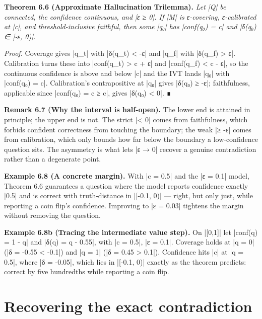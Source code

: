 \documentclass{memoir}
\begin{document}
\textbf{Theorem 6.6 (Approximate Hallucination Trilemma).} \emph{Let \LeanVerb|Q| be connected, the
confidence continuous, and \LeanVerb|ε ≥ 0|. If \LeanVerb|M| is ε-covering, ε-calibrated at \LeanVerb|c|,
and threshold-inclusive faithful, then some \LeanVerb|q₀| has \LeanVerb|conf(q₀) = c| and \LeanVerb|δ(q₀) ∈ [-ε, 0)|.}

\emph{Proof.} Coverage gives \LeanVerb|q_t| with \LeanVerb|δ(q_t) < -ε| and \LeanVerb|q_f| with \LeanVerb|δ(q_f) > ε|.
Calibration turns these into \LeanVerb|conf(q_t) > c + ε| and \LeanVerb|conf(q_f) < c - ε|, so the
continuous confidence is above and below \LeanVerb|c| and the IVT lands \LeanVerb|q₀| with
\LeanVerb|conf(q₀) = c|. Calibration's contrapositive at \LeanVerb|q₀| gives \LeanVerb|δ(q₀) ≥ -ε|;
faithfulness, applicable since \LeanVerb|conf(q₀) = c ≥ c|, gives \LeanVerb|δ(q₀) < 0|. ∎

\textbf{Remark 6.7 (Why the interval is half-open).} The lower end is attained in
principle; the upper end is not. The strict \LeanVerb|< 0| comes from faithfulness, which
forbids confident correctness from touching the boundary; the weak \LeanVerb|≥ -ε| comes
from calibration, which only bounds how far below the boundary a low-confidence
question sits. The asymmetry is what lets \LeanVerb|ε → 0| recover a genuine
contradiction rather than a degenerate point.

\textbf{Example 6.8 (A concrete margin).} With \LeanVerb|c = 0.5| and the \LeanVerb|ε = 0.1| model, Theorem
6.6 guarantees a question where the model reports confidence exactly \LeanVerb|0.5| and
is correct with truth-distance in \LeanVerb|[-0.1, 0)| — right, but only just, while
reporting a coin flip's confidence. Improving to \LeanVerb|ε = 0.03| tightens the margin
without removing the question.

\textbf{Example 6.8b (Tracing the intermediate value step).} On \LeanVerb|[0,1]| let
\LeanVerb|conf(q) = 1 - q| and \LeanVerb|δ(q) = q - 0.55|, with \LeanVerb|c = 0.5|, \LeanVerb|ε = 0.1|. Coverage
holds at \LeanVerb|q = 0| (\LeanVerb|δ = -0.55 < -0.1|) and \LeanVerb|q = 1| (\LeanVerb|δ = 0.45 > 0.1|). Confidence
hits \LeanVerb|c| at \LeanVerb|q = 0.5|, where \LeanVerb|δ = -0.05|, which lies in \LeanVerb|[-0.1, 0)| exactly as
the theorem predicts: correct by five hundredths while reporting a coin flip.



\section{Recovering the exact contradiction}\label{Two--Schemas--of--Impossibility-005F-005F-005F--Machine--Checked--Limits--of--Trustworthy--Machine--Learning-005F-005F-005F--and--Why--They--Tighten--with--Capability----Approximate--Bridges--to--Real--Models----Recovering--the--exact--contradiction}
\end{document}
